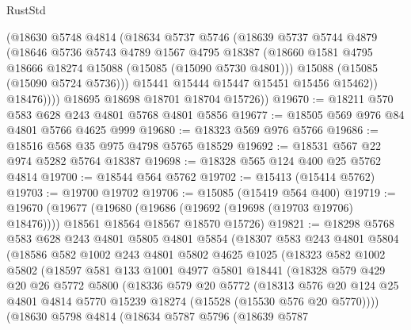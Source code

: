 \begin{lexlean}{RustStd}
\begin{coremodule}
              (@18630
                @5748
                @4814
                (@18634
                  @5737
                  @5746
                  (@18639
                    @5737
                    @5744
                    @4879
                    (@18646
                      @5736
                      @5743
                      @4789
                      @1567
                      @4795
                      @18387
                      (@18660 @1581 @4795 @18666 @18274 @15088 (@15085 (@15090 @5730 @4801)))
                      @15088
                      (@15085 (@15090 @5724 @5736)))
                    @15441
                    @15444
                    @15447
                    @15451
                    @15456
                    @15462))
                @18476))))
        @18695
        @18698
        @18701
        @18704
        @15726))
@19670 := @18211 @570 @583 @628 @243 @4801 @5768 @4801 @5856
@19677 := @18505 @569 @976 @84 @4801 @5766 @4625 @999
@19680 := @18323 @569 @976 @5766
@19686 := @18516 @568 @35 @975 @4798 @5765 @18529
@19692 := @18531 @567 @22 @974 @5282 @5764 @18387
@19698 := @18328 @565 @124 @400 @25 @5762 @4814
@19700 := @18544 @564 @5762
@19702 := @15413 (@15414 @5762)
@19703 := @19700 @19702
@19706 := @15085 (@15419 @564 @400)
@19719 := @19670
    (@19677
      (@19680 (@19686 (@19692 (@19698 (@19703 @19706) @18476))))
      @18561
      @18564
      @18567
      @18570
      @15726)
@19821 := @18298
    @5768
    @583
    @628
    @243
    @4801
    @5805
    @4801
    @5854
    (@18307
      @583
      @243
      @4801
      @5804
      (@18586
        @582
        @1002
        @243
        @4801
        @5802
        @4625
        @1025
        (@18323
          @582
          @1002
          @5802
          (@18597
            @581
            @133
            @1001
            @4977
            @5801
            @18441
            (@18328
              @579
              @429
              @20
              @26
              @5772
              @5800
              (@18336
                @579
                @20
                @5772
                (@18313
                  @576
                  @20
                  @124
                  @25
                  @4801
                  @4814
                  @5770
                  @15239
                  @18274
                  (@15528 (@15530 @576 @20 @5770))))
              (@18630
                @5798
                @4814
                (@18634
                  @5787
                  @5796
                  (@18639
                    @5787

\end{coremodule}
\end{lexlean}
